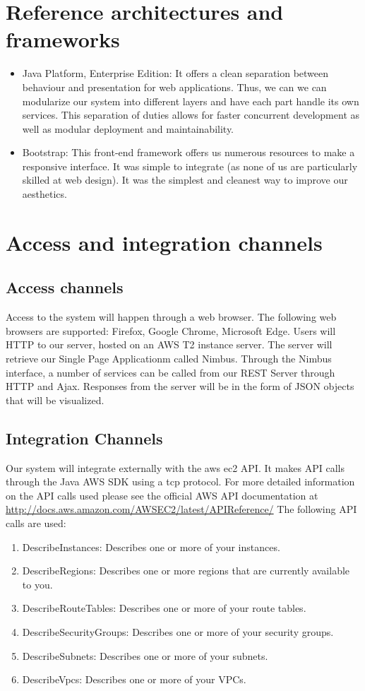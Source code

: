 \documentclass[hidelinks,a4paper,12pt]{article}
\begin{document}
\newpage
\section{Reference architectures and frameworks }

\begin{itemize} 
\item Java Platform, Enterprise Edition: It offers a clean separation between behaviour and presentation for web applications. Thus, we can we can modularize our system into different layers and have each part handle its own services. This separation of duties allows for faster concurrent development as well as modular deployment and maintainability.
\item Bootstrap: This front-end framework offers us numerous resources to make a responsive interface. It was simple to integrate (as none of us are particularly skilled at web design). It was the simplest and cleanest way to improve our aesthetics.
\end{itemize}
\newpage
\section{Access and integration channels}

\subsection{Access channels}
Access to the system will happen through a web browser. The following web browsers are supported: Firefox, Google Chrome, Microsoft Edge. Users will HTTP to our server, hosted on an AWS T2 instance server. The server will retrieve our Single Page Applicationm called Nimbus. Through the Nimbus interface, a number of services can be called from our REST Server through HTTP and Ajax. Responses from the server will be in the form of JSON objects that will be visualized. 


\subsection{Integration Channels}
Our system will integrate externally with the aws ec2 API. It makes API calls through the Java AWS SDK using a tcp protocol. For more detailed information on the API calls used please see the official AWS API documentation at \url{http://docs.aws.amazon.com/AWSEC2/latest/APIReference/}
The following API calls are used:

\begin{enumerate} 
\item DescribeInstances: Describes one or more of your instances.
\item DescribeRegions: Describes one or more regions that are currently available to you.
\item DescribeRouteTables: Describes one or more of your route tables.
\item DescribeSecurityGroups: Describes one or more of your security groups.
\item DescribeSubnets: Describes one or more of your subnets.
\item DescribeVpcs: Describes one or more of your VPCs.
\end{enumerate}
\end{document}
